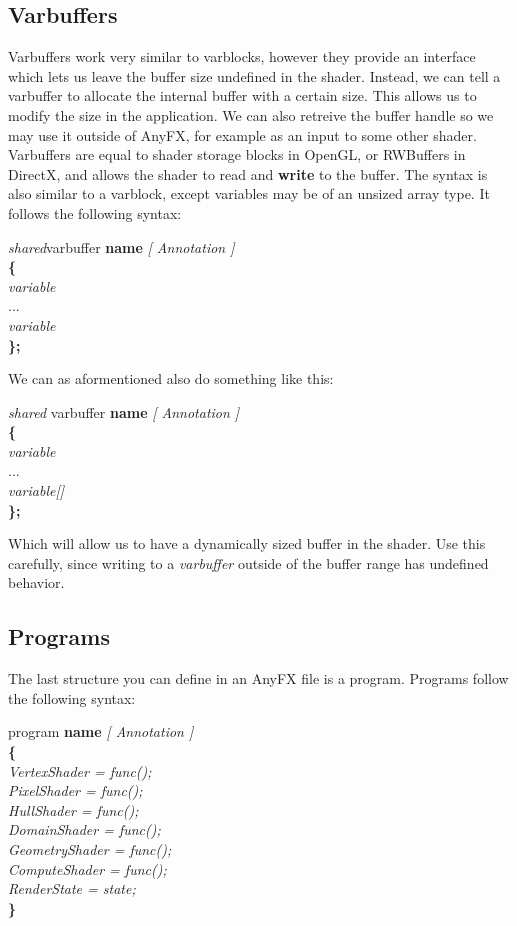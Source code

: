 \documentclass{article}
\newcommand{\SyntaxBox}[1]
{	
	\begin{center}
	\colorbox{orange!60}
	{
		\begin{minipage}{\linewidth}
		\hfill
		\begin{tabbing}
		#1
		\end{tabbing}
		\end{minipage}
	}
	\end{center}
}
\begin{document}
\subsection{Varbuffers}
Varbuffers work very similar to varblocks, however they provide an interface which lets us leave the buffer size undefined in the shader. Instead, we can tell a varbuffer to allocate the internal buffer with a certain size. This allows us to modify the size in the application. We can also retreive the buffer handle so we may use it outside of AnyFX, for example as an input to some other shader. Varbuffers are equal to shader storage blocks in OpenGL, or RWBuffers in DirectX, and allows the shader to read and \textbf{write} to the buffer. The syntax is also similar to a varblock, except variables may be of an unsized array type. It follows the following syntax:

\SyntaxBox
{
	\textit{shared}varbuffer \textbf{name} \textit{[ Annotation ]} \\
	\textbf{\{} \= \\
	\>	\textit{variable} \\
	\>	...	\\
	\>	\textit{variable} \\
	\textbf{\};}
}

We can as aformentioned also do something like this:

\SyntaxBox
{
	\textit{shared} varbuffer \textbf{name} \textit{[ Annotation ]} \\
	\textbf{\{} \= \\
	\>	\textit{variable} \\
	\>	...	\\
	\>	\textit{variable[]} \\
	\textbf{\};}
}

Which will allow us to have a dynamically sized buffer in the shader. Use this carefully, since writing to a \textit{varbuffer} outside of the buffer range has undefined behavior. 

\subsection{Programs}
The last structure you can define in an AnyFX file is a program. Programs follow the following syntax:

\SyntaxBox
{
	program \textbf{name} \textit{ [ Annotation ] } \\
	\textbf{\{} \= \\
	\>	\textit{VertexShader = func();} \\
	\>	\textit{PixelShader = func();} \\ 
	\>	\textit{HullShader = func();} \\ 
	\>	\textit{DomainShader = func();} \\ 
	\>	\textit{GeometryShader = func();} \\
	\>	\textit{ComputeShader = func();} \\
	\>	\textit{RenderState = state;} \\
	\textbf{\}}
}
\end{document}
